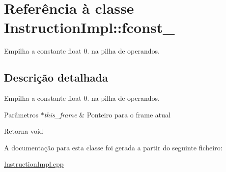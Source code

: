 \hypertarget{class_instruction_impl_1_1fconst__0}{}\section{Referência à classe Instruction\+Impl\+:\+:fconst\+\_}
\label{class_instruction_impl_1_1fconst__0}


Empilha a constante float 0. na pilha de operandos.  




\subsection{Descrição detalhada}
Empilha a constante float 0. na pilha de operandos. 


\begin{DoxyParams}{Parâmetros}
{\em $\ast$this\+\_\+frame} & Ponteiro para o frame atual \\
\hline
\end{DoxyParams}
\begin{DoxyReturn}{Retorna}
void 
\end{DoxyReturn}


A documentação para esta classe foi gerada a partir do seguinte ficheiro\+:\begin{DoxyCompactItemize}
\item 
\hyperlink{_instruction_impl_8cpp}{Instruction\+Impl.\+cpp}\end{DoxyCompactItemize}
